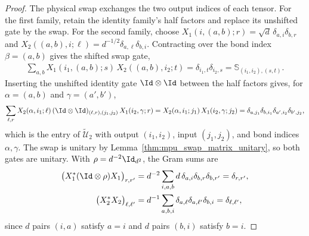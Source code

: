 \begin{proof}\leanok
    The physical swap exchanges the two output indices of each tensor.
    For the first family, retain the identity family's half factors and
    replace its unshifted gate by the swap. For the second family, choose
    $X_1(i,(a,b);r)=\sqrt d\,\delta_{a,i}\delta_{b,r}$ and
    $X_2((a,b),i;\ell)=d^{-1/2}\delta_{a,\ell}\delta_{b,i}$.
    Contracting over the bond index $\beta=(a,b)$ gives the shifted swap
    gate,
    \begin{align}
        \sum_{a,b}X_1(i_1,(a,b);s)\,X_2((a,b),i_2;t)
        =\delta_{i_1,t}\delta_{i_2,s}
        =\mathbb S_{(i_1,i_2),(s,t)}.
    \end{align}
    Inserting the unshifted identity gate $\Id\otimes\Id$ between the half
    factors gives, for $\alpha=(a,b)$ and $\gamma=(a',b')$,
    \begin{align}
        \sum_{\ell,r}X_2(\alpha,i_1;\ell)\,
        (\Id\otimes\Id)_{(\ell,r),(j_1,j_2)}\,X_1(i_2,\gamma;r)
        =X_2(\alpha,i_1;j_1)\,X_1(i_2,\gamma;j_2)
        =\delta_{a,j_1}\delta_{b,i_1}\delta_{a',i_2}\delta_{b',j_2},
    \end{align}
    which is the entry of $\widetilde{\mathcal U}_2$ with output
    $(i_1,i_2)$, input $(j_1,j_2)$, and bond indices $\alpha,\gamma$.
    The swap is unitary by Lemma~\ref{thm:mpu_swap_matrix_unitary}, so
    both gates are unitary. With $\rho=d^{-2}\Id_{d^2}$, the Gram sums are
    \begin{align}
        \bigl(X_1^*(\Id\otimes\rho)X_1\bigr)_{r,r'}
         & =d^{-2}\sum_{i,a,b}d\,\delta_{a,i}\delta_{b,r}\delta_{b,r'}
        =\delta_{r,r'},                                                   \\
        \bigl(X_2^*X_2\bigr)_{\ell,\ell'}
         & =d^{-1}\sum_{a,b,i}\delta_{a,\ell}\delta_{a,\ell'}\delta_{b,i}
        =\delta_{\ell,\ell'},
    \end{align}
    since $d$ pairs $(i,a)$ satisfy $a=i$ and $d$ pairs $(b,i)$ satisfy $b=i$.
\end{proof}



